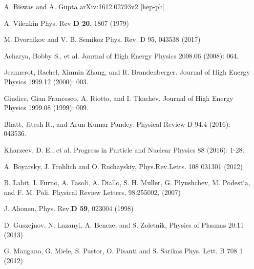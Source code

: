 \documentclass{ws-mpla}
\begin{document}
\begin{thebibliography}{99}
A. Biswas and A. Gupta 
arXiv:1612.02793v2 [hep-ph] 

 A. Vilenkin  Phys. Rev {\bf D 20}, 1807  (1979)

 M. Dvornikov and V. B. Semikoz
Phys. Rev. D 95, 043538 (2017)

 Acharya, Bobby S., et al. 
Journal of High Energy Physics 2008.06 (2008): 064.

 Jeannerot, Rachel, Xinmin Zhang, and R. Brandenberger. 
Journal of High Energy Physics 1999.12 (2000): 003.

 Giudice, Gian Francesco, A. Riotto, and I. Tkachev. 
Journal of High Energy Physics 1999.08 (1999): 009.

 Bhatt, Jitesh R., and Arun Kumar Pandey. 
Physical Review D 94.4 (2016): 043536.

 Kharzeev, D. E., et al. 
Progress in Particle and Nuclear Physics 88 (2016): 1-28.

 A. Boyarsky, J. Frohlich and O. Ruchayskiy, Phys.Rev.Letts. 108 031301 (2012)



 B. Labit, I. Furno, A. Fasoli, A. Diallo, S. H. Muller, G. Plyushchev, M. Podest`a, and F. M. Poli.  
Physical Review Letters, 98:255002, (2007)

 J. Ahonen, Phys. Rev.{\bf D 59}, 023004 (1998)

 D. Guszejnov, N. Lazanyi, A. Bencze, and S. Zoletnik, 
Physics of Plasmas  20:11 (2013)

G. Mangano, G. Miele, S. Pastor, O. Pisanti and S. Sarikas
Phys. Lett. B 708 1 (2012)

\end{thebibliography}
\end{document}
